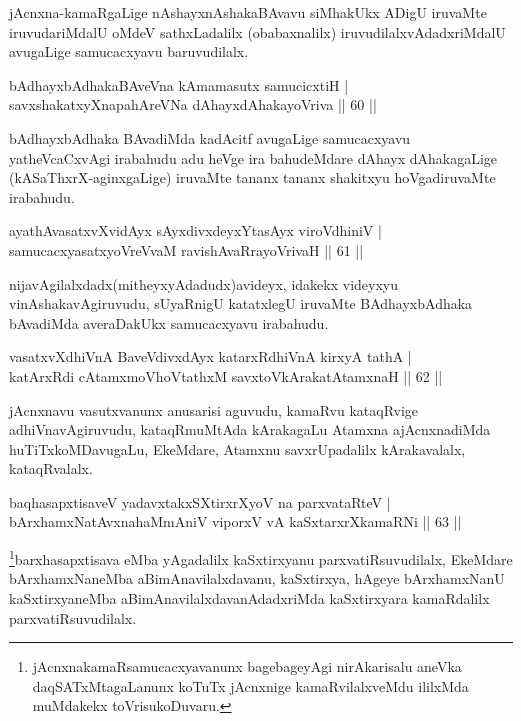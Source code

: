 \begin{artha}
jAcnxna-kamaRgaLige nAshayxnAshakaBAvavu siMhakUkx ADigU iruvaMte iruvudariMdalU oMdeV sathxLadalilx (obabaxnalilx) iruvudilalxvAdadxriMdalU avugaLige samucacxyavu baruvudilalx.
\end{artha}

\begin{shl}
bAdhayxbAdhakaBAveVna kAmamasutx samucicxtiH |\\
savxshakatxyXnapahAreVNa dAhayxdAhakayoVriva \hfill || 60 ||
\end{shl}

\begin{artha}
bAdhayxbAdhaka BAvadiMda kadAcitf avugaLige samucacxyavu yatheVcaCxvAgi irabahudu adu heVge ira bahudeMdare dAhayx dAhakagaLige (kASaThxrX-aginxgaLige) iruvaMte tananx tananx shakitxyu hoVgadiruvaMte irabahudu.
\end{artha}

\begin{shl}
ayathAvasatxvXvidAyx sAyxdivxdeyxYtasAyx viroVdhiniV |\\
samucacxyasatxyoVreVvaM ravishAvaRrayoVrivaH \hfill || 61 ||
\end{shl}

\begin{artha}
nijavAgilalxdadx(mitheyxyAdadudx)avideyx, idakekx videyxyu vinAshakavAgiruvudu, sUyaRnigU katatxlegU iruvaMte BAdhayxbAdhaka bAvadiMda averaDakUkx samucacxyavu irabahudu.
\end{artha}

\begin{shl}
vasatxvXdhiVnA BaveVdivxdAyx katarxRdhiVnA kirxyA tathA |\\
katArxRdi cA\s \s tamxmoVhoVtathxM savxtoV\s kArakatA\s \s tamxnaH \hfill || 62 ||
\end{shl}

\begin{artha}
jAcnxnavu vasutxvanunx anusarisi aguvudu, kamaRvu kataqRvige adhiVnavAgiruvudu, kataqRmuMtAda kArakagaLu Atamxna ajAcnxnadiMda huTiTxkoMDavugaLu, EkeMdare, Atamxnu savxrUpadalilx kArakavalalx, kataqRvalalx.
\end{artha}

\begin{shl}
baqhasapxtisaveV yadavxtakxSXtirxrXyoV na parxvataRteV |\\
bArxhamxNatAvxnahaMmAniV viporxV vA kaSxtarxrXkamaRNi \hfill || 63 ||
\end{shl}

\begin{artha}
\footnote{jAcnxnakamaRsamucacxyavanunx bagebageyAgi nirAkarisalu aneVka daqSATxMtagaLanunx koTuTx jAcnxnige kamaRvilalxveMdu ililxMda muMdakekx toVrisukoDuvaru.}barxhasapxtisava eMba yAgadalilx kaSxtirxyanu parxvatiRsuvudilalx, EkeMdare bArxhamxNaneMba aBimAnavilalxdavanu, kaSxtirxya, hAgeye bArxhamxNanU  kaSxtirxyaneMba aBimAnavilalxdavanAdadxriMda kaSxtirxyara kamaRdalilx parxvatiRsuvudilalx.
\end{artha}

